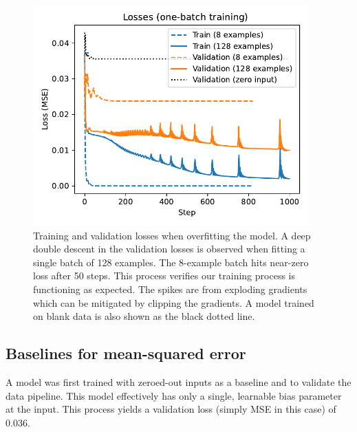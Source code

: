 \begin{figure}
	\centering
	\includegraphics[width=300pt]{figures/PP1_overfit_losses.pdf}
	\caption[Training and validation losses when overfitting the model]{\label{fig:PP1_overfit_losses}Training and validation losses when overfitting the model. A deep double descent in the validation losses is observed when fitting a single batch of 128 examples. The 8-example batch hits near-zero loss after 50 steps. This process verifies our training process is functioning as expected. The spikes are from exploding gradients which can be mitigated by clipping the gradients. A model trained on blank data is also shown as the black dotted line.}
\end{figure}

\subsection{Baselines for mean-squared error}
\label{sec:baselines}

A model was first trained with zeroed-out inputs as a baseline and to validate the data pipeline. This model effectively has only a single, learnable bias parameter at the input. This process yields a validation loss (simply MSE in this case) of 0.036. 

